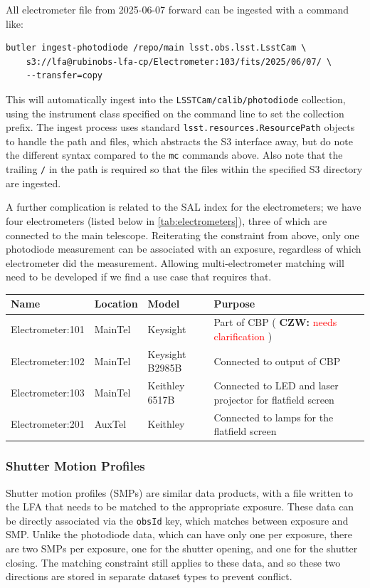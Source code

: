 \documentclass[DM,authoryear,toc]{lsstdoc}
\newcommand{\czw}[1]{
  \textbf{CZW: }\textcolor{red}{#1}
}
\begin{document}
All electrometer file from 2025-06-07 forward can be ingested with a command like:
\begin{verbatim}
butler ingest-photodiode /repo/main lsst.obs.lsst.LsstCam \
    s3://lfa@rubinobs-lfa-cp/Electrometer:103/fits/2025/06/07/ \
    --transfer=copy
\end{verbatim}
This will automatically ingest into the \verb|LSSTCam/calib/photodiode| collection, using the instrument class specified on the command line to set the collection prefix.
The ingest process uses standard \verb|lsst.resources.ResourcePath| objects to handle the path and files, which abstracts the S3 interface away, but do note the different syntax compared to the \verb|mc| commands above.
Also note that the trailing \verb|/| in the path is required so that the files within the specified S3 directory are ingested.

A further complication is related to the SAL index for the electrometers; we have four electrometers (listed below in \ref{tab:electrometers}), three of which are connected to the main telescope.
Reiterating the constraint from above, only one photodiode measurement can be associated with an exposure, regardless of which electrometer did the measurement.
Allowing multi-electrometer matching will need to be developed if we find a use case that requires that.

\begin{tabular}{l|l|l|l}
  \label{tab:electrometers}
    Name & Location & Model & Purpose \\
    \hline
    Electrometer:101 & MainTel & Keysight & Part of CBP (\czw{needs clarification}) \\
    Electrometer:102 & MainTel & Keysight B2985B & Connected to output of CBP \\
    Electrometer:103 & MainTel & Keithley 6517B & Connected to LED and laser projector for flatfield screen \\
    Electrometer:201 & AuxTel & Keithley & Connected to lamps for the flatfield screen \\
\end{tabular}

\subsubsection{Shutter Motion Profiles}

Shutter motion profiles (SMPs) are similar data products, with a file written to the LFA that needs to be matched to the appropriate exposure.
These data can be directly associated via the \verb|obsId| key, which matches between exposure and SMP.
Unlike the photodiode data, which can have only one per exposure, there are two SMPs per exposure, one for the shutter opening, and one for the shutter closing.
The matching constraint still applies to these data, and so these two directions are stored in separate dataset types to prevent conflict.
\end{document}
